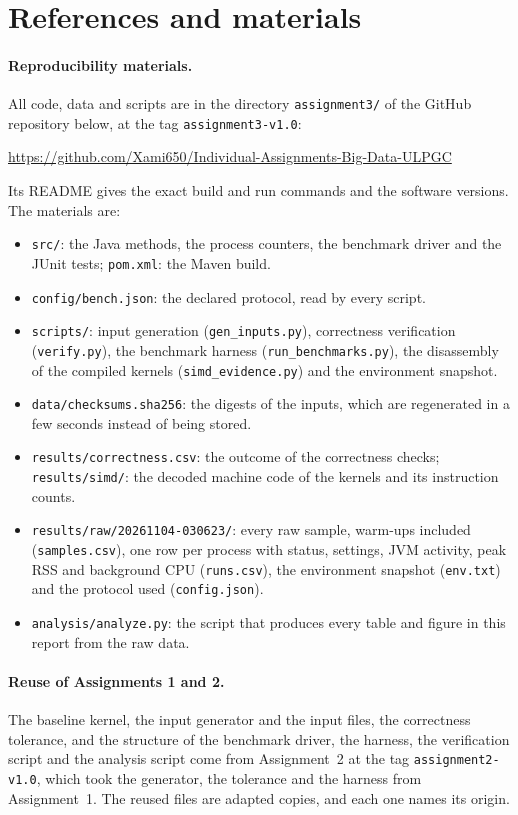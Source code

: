 \documentclass[11pt,a4paper]{article}
\newcommand{\repourl}{\url{https://github.com/Xami650/Individual-Assignments-Big-Data-ULPGC}}
\newcommand{\session}{\texttt{20261104-030623}}
\begin{document}
\section{References and materials}
\label{sec:materials}

\paragraph{Reproducibility materials.} All code, data and scripts are in the
directory \texttt{assignment3/} of the GitHub repository below, at the tag
\texttt{assignment3-v1.0}:
\begin{center}\repourl\end{center}
Its README gives the exact build and run commands and the software versions.
The materials are:
\begin{itemize}
  \item \texttt{src/}: the Java methods, the process counters, the benchmark
  driver and the JUnit tests; \texttt{pom.xml}: the Maven build.
  \item \texttt{config/bench.json}: the declared protocol, read by every script.
  \item \texttt{scripts/}: input generation (\texttt{gen\_inputs.py}),
  correctness verification (\texttt{verify.py}), the benchmark harness
  (\texttt{run\_benchmarks.py}), the disassembly of the compiled kernels
  (\texttt{simd\_evidence.py}) and the environment snapshot.
  \item \texttt{data/checksums.sha256}: the digests of the inputs, which are
  regenerated in a few seconds instead of being stored.
  \item \texttt{results/correctness.csv}: the outcome of the correctness checks;
  \texttt{results/simd/}: the decoded machine code of the kernels and its
  instruction counts.
  \item \texttt{results/raw/\session/}: every raw sample, warm-ups included
  (\texttt{samples.csv}), one row per process with status, settings, JVM
  activity, peak RSS and background CPU (\texttt{runs.csv}), the environment
  snapshot (\texttt{env.txt}) and the protocol used (\texttt{config.json}).
  \item \texttt{analysis/analyze.py}: the script that produces every table and
  figure in this report from the raw data.
\end{itemize}

\paragraph{Reuse of Assignments 1 and 2.} The baseline kernel, the input
generator and the input files, the correctness tolerance, and the structure of
the benchmark driver, the harness, the verification script and the analysis
script come from Assignment~2 at the tag \texttt{assignment2-v1.0}, which took
the generator, the tolerance and the harness from Assignment~1. The reused
files are adapted copies, and each one names its origin.
\end{document}

